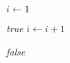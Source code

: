 
\begin{algorithm}[H]
  \begin{algorithmic}[1]
      \State $i \gets 1$

      \hStatex
	  \State \Return \textsl{true}
	\EndIf
	\State $i \gets i + 1$
      \EndWhile

      \hStatex
	\State \Return \textsl{false}
    \EndProcedure
  \end{algorithmic}
\end{algorithm}
